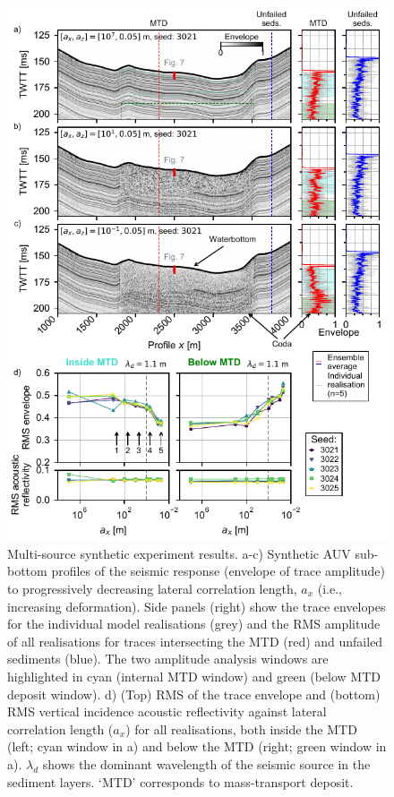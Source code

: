 \documentclass[se,manuscript]{copernicus}
\begin{document}
\begin{figure}
    \includegraphics[width=12cm]{figures/fig06.pdf}
    \caption{
        Multi-source synthetic experiment results.
        a-c) Synthetic AUV sub-bottom profiles of the seismic response (envelope of trace amplitude) to progressively decreasing lateral correlation length, $a_x$ (i.e., increasing deformation).
        Side panels (right) show the trace envelopes for the individual model realisations (grey) and the RMS amplitude of all realisations for traces intersecting the MTD (red) and unfailed sediments (blue).
        The two amplitude analysis windows are highlighted in cyan (internal MTD window) and green (below MTD deposit window).
        d) (Top) RMS of the trace envelope and (bottom) RMS vertical incidence acoustic reflectivity against lateral correlation length ($a_x$) for all realisations, both inside the MTD (left; cyan window in a) and below the MTD (right; green window in a).
        $\lambda_d$ shows the dominant wavelength of the seismic source in the sediment layers.
        `MTD' corresponds to mass-transport deposit.
    }
    \label{fig:multi-source-results}
\end{figure}
\end{document}
